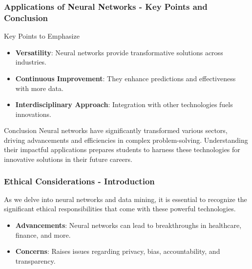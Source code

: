 \documentclass[aspectratio=169]{beamer}
\begin{document}
\begin{frame}[fragile]
    \frametitle{Applications of Neural Networks - Key Points and Conclusion}
    \begin{block}{Key Points to Emphasize}
        \begin{itemize}
            \item \textbf{Versatility}: Neural networks provide transformative solutions across industries.
            \item \textbf{Continuous Improvement}: They enhance predictions and effectiveness with more data.
            \item \textbf{Interdisciplinary Approach}: Integration with other technologies fuels innovations.
        \end{itemize}
    \end{block}
    
    \begin{block}{Conclusion}
        Neural networks have significantly transformed various sectors, driving advancements and efficiencies in complex problem-solving. Understanding their impactful applications prepares students to harness these technologies for innovative solutions in their future careers.
    \end{block}
\end{frame}

\begin{frame}[fragile]
    \frametitle{Ethical Considerations - Introduction}
    As we delve into neural networks and data mining, it is essential to recognize the significant ethical responsibilities that come with these powerful technologies. 
    \begin{itemize}
        \item \textbf{Advancements}: Neural networks can lead to breakthroughs in healthcare, finance, and more.
        \item \textbf{Concerns}: Raises issues regarding privacy, bias, accountability, and transparency.
    \end{itemize}
\end{frame}
\end{document}
